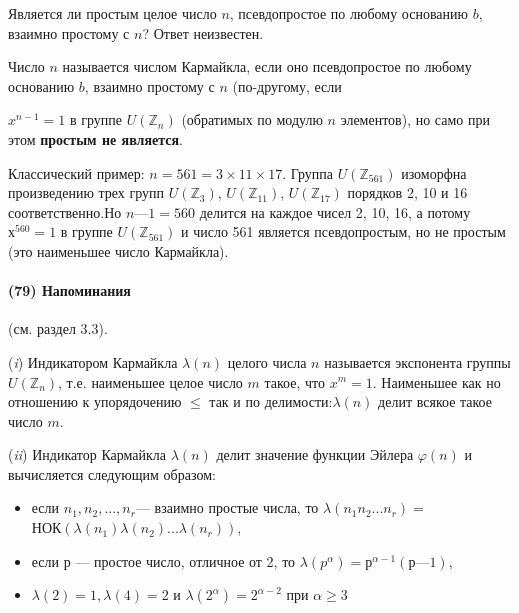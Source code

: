 \documentclass{mai_book}
\begin{document}
  	\noindent
  	
	Является ли простым целое число $n$, псевдопростое по любому основанию $b$, взаимно простому с $n$? Ответ неизвестен.

  	

  	
	\begin{determ}
  	
	\noindent
  	

  	
	Число $n$ называется числом Кармайкла, если оно псевдопростое
	по любому основанию $b$, взаимно простому с $n$ (по-другому, если
  	

  	
	\pagebreak
  	
  	 \noindent
  	 $x^{n-1} = 1$ в группе $U(\mathbb Z_n)$ (обратимых по модулю $n$ элементов), но само при этом {\bf простым не является}. 
  	\end{determ}
  	Классический пример: $n = 561 = 3 \times 11 \times 17$. Группа $U(\mathbb Z_{561})$ изоморфна произведению трех групп $U(\mathbb Z_3)$, $U(\mathbb Z_{11})$, $U(\mathbb Z_{17})$ порядков 2, 10	и 16 соответственно.Но $n — 1 = 560$ делится на каждое чисел 2, 10, 16, а потому $х^{560} = 1$ в группе $U(\mathbb Z_{561})$ и число 561 является псевдопростым,	но не простым (это наименьшее число Кармайкла).

  	
  	\paragraph{(79) Напоминания} (см. раздел 3.3).
  	\noindent
  	
  	({\it i}) Индикатором Кармайкла $\lambda(n)$ целого числа $n$ называется экспонента группы $U(\mathbb Z_{n})$, т.е. наименьшее целое число $m$ такое, что $x^m = 1$.	Наименьшее как но отношению к упорядочению $\leqslant$ так и по делимости:$\lambda(n)$ делит всякое такое число $m$.
  	
  	({\it ii}) Индикатор Кармайкла $\lambda(n)$ делит значение функции Эйлера 	$\varphi(n)$ и вычисляется следующим образом:
  	\begin{itemize}
  		\item если $n_1,n_2,...,n_r$— взаимно простые числа, то $\lambda(n_1n_2...n_r)=$ \\ НОК$(\lambda(n_1)\lambda(n_2)...\lambda(n_r))$,
  		\item если $р$ — простое число, отличное от 2, то $\lambda(p^{\alpha}) = р^{\alpha-1}(р — 1)$,
  		\item $\lambda(2)=1,\lambda(4)=2$ и $\lambda(2^{\alpha})=2^{\alpha-2}$ при $\alpha \geqslant 3$
  	\end{itemize}
  
\end{document}
